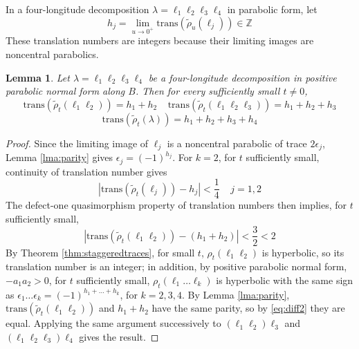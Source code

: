 \documentclass{article}
\theoremstyle{plain}
\theoremstyle{definition}
\theoremstyle{plain}
\theoremstyle{plain}
\theoremstyle{plain}
\newtheorem{lemma}[theorem]{Lemma}
\theoremstyle{remark}
\theoremstyle{remark}
\theoremstyle{plain}
\theoremstyle{plain}
\theoremstyle{plain}
\theoremstyle{plain}
\begin{document}
In a four-longitude decomposition $\lambda = \ell_1\ell_2\ell_3\ell_4$ in parabolic form, let
\begin{equation*}
	h_j = \lim_{u \to 0^+}\mathrm{trans}(\widetilde\rho_u(\ell_j)) \in \mathbb Z
\end{equation*}
These translation numbers are integers because their limiting images are noncentral parabolics.

\begin{lemma}\label{lma:trans}
Let $\lambda=\ell_1\ell_2\ell_3\ell_4$ be a four-longitude decomposition in positive parabolic normal form along $B$. Then for every sufficiently small $t \neq 0$, 
\begin{equation*}
	\mathrm{trans}(\widetilde\rho_t(\ell_1\ell_2)) = h_1 + h_2 \ \ \ \ \ \mathrm{trans}(\widetilde\rho_t(\ell_1\ell_2\ell_3)) = h_1 + h_2 + h_3
\end{equation*}
\begin{equation*}
	\mathrm{trans}(\widetilde\rho_t(\lambda)) = h_1+h_2+h_3+h_4
\end{equation*}
\end{lemma}

\begin{proof}
Since the limiting image of $\ell_j$ is a noncentral parabolic of trace $2\epsilon_j$, Lemma \ref{lma:parity} gives $\epsilon_j = (-1)^{h_j}$. For $k = 2$, for $t$ sufficiently small, continuity of translation number gives
\begin{equation*}
	|\mathrm{trans}(\widetilde\rho_t(\ell_j)) - h_j| < \frac14 \ \ \ \ \ j = 1, 2
\end{equation*}
The defect-one quasimorphism property of translation numbers then implies, for $t$ sufficiently small,
\begin{equation}\label{eq:diff2}
	|\mathrm{trans}(\widetilde\rho_t(\ell_1\ell_2)) - (h_1 + h_2)| < \frac32 < 2
\end{equation} 
By Theorem \ref{thm:staggeredtraces}, for small $t$, $\rho_t(\ell_1\ell_2)$ is hyperbolic, so its translation number is an integer; in addition, by positive parabolic normal form, $-a_1a_2 > 0$, for $t$ sufficiently small, $\rho_t(\ell_1\dots\ell_k)$ is hyperbolic with the same sign as $\epsilon_1\dots\epsilon_k = (-1)^{h_1+\dots+h_k}$, for $k = 2, 3, 4$. By Lemma \ref{lma:parity}, $\mathrm{trans}(\widetilde\rho_t(\ell_1\ell_2))$ and $h_1 + h_2$ have the same parity, so by \eqref{eq:diff2} they are equal. Applying the same argument successively to $(\ell_1\ell_2)\ell_3$ and $(\ell_1\ell_2\ell_3)\ell_4$ gives the result.
\end{proof}
\end{document}
